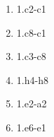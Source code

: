 \begin{enumerate}
\setcounter{enumi}{\value{d_counter}}
\item 1.\rook{}c2-c1\mate{}
\item 1.\rook{}c8-c1\mate{}
\item 1.\rook{}c3-c8\mate{}
\item 1.\rook{}h4-h8\mate{}
\item 1.\rook{}e2-a2\mate{}
\item 1.\rook{}e6-e1\mate{}
\setcounter{d_counter}{\value{enumi}}
\end{enumerate}